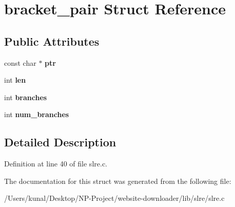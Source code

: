 \hypertarget{structbracket__pair}{}\section{bracket\+\_\+pair Struct Reference}
\label{structbracket__pair}
\subsection*{Public Attributes}
\begin{DoxyCompactItemize}
\item 
\mbox{\label{structbracket__pair_adb69cce531597d984aa90a11b0a81263}} 
const char $\ast$ {\bfseries ptr}
\item 
\mbox{\label{structbracket__pair_a0f6ea40572fc1ae10b619b1c9a319cf5}} 
int {\bfseries len}
\item 
\mbox{\label{structbracket__pair_ab34eb7377a268ac7d8acb9edef0f3f15}} 
int {\bfseries branches}
\item 
\mbox{\label{structbracket__pair_ac1b31e09a0f44ca2b433b20a61030d64}} 
int {\bfseries num\+\_\+branches}
\end{DoxyCompactItemize}


\subsection{Detailed Description}


Definition at line 40 of file slre.\+c.



The documentation for this struct was generated from the following file\+:\begin{DoxyCompactItemize}
\item 
/\+Users/kunal/\+Desktop/\+N\+P-\/\+Project/website-\/downloader/lib/slre/slre.\+c\end{DoxyCompactItemize}
